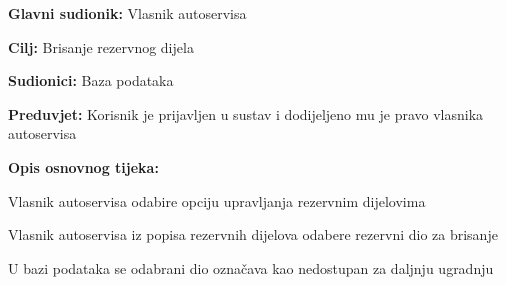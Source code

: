 \noindent {}
\begin{packed_item}

	\item \textbf{Glavni sudionik: } Vlasnik autoservisa
	\item  \textbf{Cilj:} Brisanje rezervnog dijela
	\item  \textbf{Sudionici:} Baza podataka
	\item  \textbf{Preduvjet:} Korisnik je prijavljen u sustav i dodijeljeno
	mu je pravo vlasnika autoservisa
	\item  \textbf{Opis osnovnog tijeka:}

	\item[] \begin{packed_enum}

		\item Vlasnik autoservisa odabire opciju upravljanja rezervnim dijelovima
		\item Vlasnik autoservisa iz popisa rezervnih dijelova odabere rezervni
		dio za brisanje
		\item U bazi podataka se odabrani dio označava kao nedostupan za daljnju
		ugradnju

	\end{packed_enum}
\end{packed_item}


